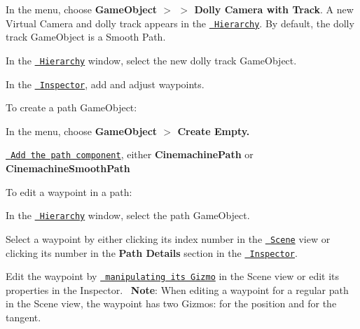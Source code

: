 \begin{DoxyEnumerate}
\item In the  menu, choose {\bfseries{Game\+Object \texorpdfstring{$>$}{>}  \texorpdfstring{$>$}{>} Dolly Camera with Track}}. A new Virtual Camera and dolly track appears in the \href{[https://docs.unity3d.com/Manual/Hierarchy.html](https://docs.unity3d.com/Manual/Hierarchy.html)}{\texttt{ Hierarchy}}. By default, the dolly track Game\+Object is a Smooth Path.
\item In the \href{[https://docs.unity3d.com/Manual/Hierarchy.html](https://docs.unity3d.com/Manual/Hierarchy.html)}{\texttt{ Hierarchy}} window, select the new dolly track Game\+Object.
\item In the \href{[https://docs.unity3d.com/Manual/UsingTheInspector.html](https://docs.unity3d.com/Manual/UsingTheInspector.html)}{\texttt{ Inspector}}, add and adjust waypoints.
\end{DoxyEnumerate}

To create a path Game\+Object\+:


\begin{DoxyEnumerate}
\item In the  menu, choose {\bfseries{Game\+Object \texorpdfstring{$>$}{>} Create Empty.}}
\item \href{https://docs.unity3d.com/Manual/UsingComponents.html}{\texttt{ Add the path component}}, either {\bfseries{Cinemachine\+Path}} or {\bfseries{Cinemachine\+Smooth\+Path}}
\end{DoxyEnumerate}

To edit a waypoint in a path\+:


\begin{DoxyEnumerate}
\item In the \href{[https://docs.unity3d.com/Manual/Hierarchy.html](https://docs.unity3d.com/Manual/Hierarchy.html)}{\texttt{ Hierarchy}} window, select the path Game\+Object.
\item Select a waypoint by either clicking its index number in the \href{https://docs.unity3d.com/Manual/UsingTheSceneView.html}{\texttt{ Scene}} view or clicking its number in the {\bfseries{Path Details}} section in the \href{https://docs.unity3d.com/Manual/UsingTheInspector.html}{\texttt{ Inspector}}.
\item Edit the waypoint by \href{https://docs.unity3d.com/Manual/PositioningGameObjects.html}{\texttt{ manipulating its Gizmo}} in the Scene view or edit its properties in the Inspector.~\newline
{\bfseries{Note}}\+: When editing a waypoint for a regular path in the Scene view, the waypoint has two Gizmos\+: for the position and for the tangent. 
\end{DoxyEnumerate}